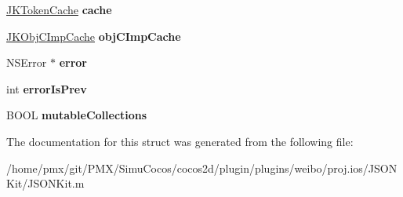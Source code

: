 \begin{DoxyCompactItemize}
\item 
\mbox{\label{structJKParseState_ab2ca3852fea527ab91bd92c88f815071}} 
\hyperlink{structJKTokenCache}{J\+K\+Token\+Cache} {\bfseries cache}
\item 
\mbox{\label{structJKParseState_a624df08c0fa58d317dc51d51c24f66ad}} 
\hyperlink{structJKObjCImpCache}{J\+K\+Obj\+C\+Imp\+Cache} {\bfseries obj\+C\+Imp\+Cache}
\item 
\mbox{\label{structJKParseState_aac482928f44dcfaf76ae8c433c55275a}} 
N\+S\+Error $\ast$ {\bfseries error}
\item 
\mbox{\label{structJKParseState_af0f3b08c1e9ff308b882b8ccd7d82f81}} 
int {\bfseries error\+Is\+Prev}
\item 
\mbox{\label{structJKParseState_a8df957ed41d5c7ac5f4d38ebb1bc0f73}} 
B\+O\+OL {\bfseries mutable\+Collections}
\end{DoxyCompactItemize}


The documentation for this struct was generated from the following file\+:\begin{DoxyCompactItemize}
\item 
/home/pmx/git/\+P\+M\+X/\+Simu\+Cocos/cocos2d/plugin/plugins/weibo/proj.\+ios/\+J\+S\+O\+N\+Kit/J\+S\+O\+N\+Kit.\+m\end{DoxyCompactItemize}
